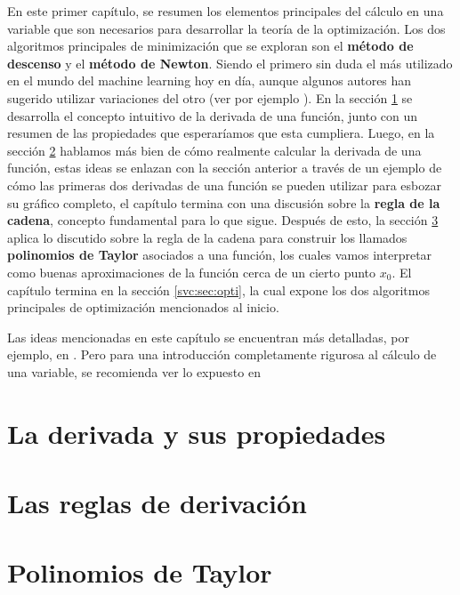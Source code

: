En este primer capítulo, se resumen los elementos principales del cálculo en una variable que son necesarios para desarrollar la teoría de la optimización. Los dos algoritmos principales de minimización que se exploran son el \textbf{método de descenso} y el \textbf{método de Newton}. Siendo el primero sin duda el más utilizado en el mundo del machine learning hoy en día, aunque algunos autores han sugerido utilizar variaciones del otro (ver por ejemplo \cite{optimizacion-methods-for-dl}). En la sección \ref{svc:sec:derivada} se desarrolla el concepto intuitivo de la derivada de una función, junto con un resumen de las propiedades que esperaríamos que esta cumpliera. Luego, en la sección \ref{svc:sec:reglas} hablamos más bien de cómo realmente calcular la derivada de una función, estas ideas se enlazan con la sección anterior a través de un ejemplo de cómo las primeras dos derivadas de una función se pueden utilizar para esbozar su gráfico completo, el capítulo termina con una discusión sobre la \textbf{regla de la cadena}, concepto fundamental para lo que sigue. Después de esto, la sección \ref{svc:sec:taylor} aplica lo discutido sobre la regla de la cadena para construir los llamados \textbf{polinomios de Taylor} asociados a una función, los cuales vamos interpretar como buenas aproximaciones de la función cerca de un cierto punto $x_0$. El capítulo termina en la sección \ref{svc:sec:opti}, la cual expone los dos algoritmos principales de optimización mencionados al inicio.

Las ideas mencionadas en este capítulo se encuentran más detalladas, por ejemplo, en \cite{apunte-mate1}. Pero para una introducción completamente rigurosa al cálculo de una variable, se recomienda ver lo expuesto en \cite{spivak1988cálculo}

\section{La derivada y sus propiedades} \label{svc:sec:derivada}

\section{Las reglas de derivación} \label{svc:sec:reglas}

\section{Polinomios de Taylor} \label{svc:sec:taylor}

